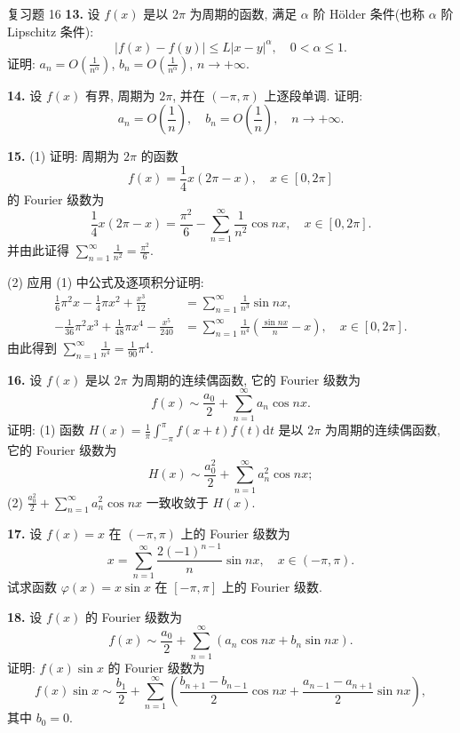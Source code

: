 \begin{exblock}{复习题 16}
\textbf{13.} 设 $f(x)$ 是以 $2\pi$ 为周期的函数, 满足 $\alpha$ 阶 H\"older 条件(也称 $\alpha$ 阶 Lipschitz 条件):
\[
  |f(x)-f(y)|\leqslant L|x-y|^{\alpha},\quad 0<\alpha\leqslant1.
\]
证明: $\displaystyle a_{n}=O\left(\frac{1}{n^{\alpha}}\right)$, $\displaystyle b_{n}=O\left(\frac{1}{n^{\alpha}}\right)$, $n\to+\infty$.

\textbf{14.} 设 $f(x)$ 有界, 周期为 $2\pi$, 并在 $(-\pi,\pi)$ 上逐段单调. 证明:
\[
  a_{n}=O\left(\frac{1}{n}\right),\quad b_{n}=O\left(\frac{1}{n}\right),\quad n\to+\infty.
\]

\textbf{15.} (1) 证明: 周期为 $2\pi$ 的函数
\[
  f(x)=\frac{1}{4}x(2\pi-x),\quad x\in[0,2\pi]
\]
的 Fourier 级数为
\[
  \frac{1}{4}x(2\pi-x)=\frac{\pi^{2}}{6}-\sum_{n=1}^{\infty}\frac{1}{n^{2}}\cos nx,\quad x\in[0,2\pi].
\]
并由此证得 $\displaystyle\sum_{n=1}^{\infty}\frac{1}{n^{2}}=\frac{\pi^{2}}{6}$.

(2) 应用 (1) 中公式及逐项积分证明:
\begin{align*}
  \frac{1}{6}\pi^{2}x-\frac{1}{4}\pi x^{2}+\frac{x^{3}}{12}&=\sum_{n=1}^{\infty}\frac{1}{n^{3}}\sin nx,\\
  -\frac{1}{36}\pi^{2}x^{3}+\frac{1}{48}\pi x^{4}-\frac{x^{5}}{240}&=\sum_{n=1}^{\infty}\frac{1}{n^{4}}\left(\frac{\sin nx}{n}-x\right),\quad x\in[0,2\pi].
\end{align*}
由此得到 $\displaystyle\sum_{n=1}^{\infty}\frac{1}{n^{4}}=\frac{1}{90}\pi^{4}$.

\textbf{16.} 设 $f(x)$ 是以 $2\pi$ 为周期的连续偶函数, 它的 Fourier 级数为
\[
  f(x)\sim\frac{a_{0}}{2}+\sum_{n=1}^{\infty}a_{n}\cos nx.
\]
证明: (1) 函数 $\displaystyle H(x)=\frac{1}{\pi}\int_{-\pi}^{\pi}f(x+t)f(t)\mathrm{d}t$ 是以 $2\pi$ 为周期的连续偶函数, 它的 Fourier 级数为
\[
  H(x)\sim\frac{a_{0}^{2}}{2}+\sum_{n=1}^{\infty}a_{n}^{2}\cos nx;
\]
(2) $\displaystyle\frac{a_{0}^{2}}{2}+\sum_{n=1}^{\infty}a_{n}^{2}\cos nx$ 一致收敛于 $H(x)$.

\textbf{17.} 设 $f(x)=x$ 在 $(-\pi,\pi)$ 上的 Fourier 级数为
\[
  x=\sum_{n=1}^{\infty}\frac{2(-1)^{n-1}}{n}\sin nx,\quad x\in(-\pi,\pi).
\]
试求函数 $\varphi(x)=x\sin x$ 在 $[-\pi,\pi]$ 上的 Fourier 级数.

\textbf{18.} 设 $f(x)$ 的 Fourier 级数为
\[
  f(x)\sim\frac{a_{0}}{2}+\sum_{n=1}^{\infty}\left(a_{n}\cos nx+b_{n}\sin nx\right).
\]
证明: $f(x)\sin x$ 的 Fourier 级数为
\[
  f(x)\sin x\sim\frac{b_{1}}{2}+\sum_{n=1}^{\infty}\left(\frac{b_{n+1}-b_{n-1}}{2}\cos nx+\frac{a_{n-1}-a_{n+1}}{2}\sin nx\right),
\]
其中 $b_{0}=0$.
\end{exblock}

